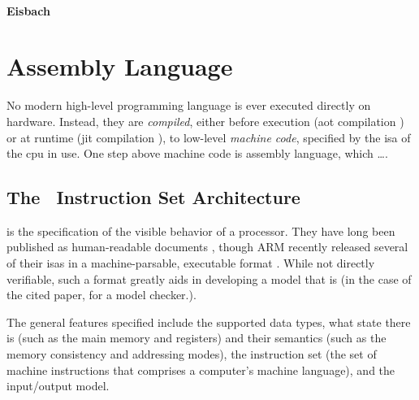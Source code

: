 \paragraph{Eisbach}


%
%

\section{Assembly Language}\label{se:assembly_language}
No modern high-level programming language is ever executed directly on hardware.
Instead, they are \emph{compiled},%
either before execution (\ac{aot} compilation \autocite{})%
or at runtime (\ac{jit} compilation \autocite{}),
to low-level \emph{machine code}, specified by the \ac{isa} of the \ac{cpu} in use.
One step above machine code is assembly language,
which \todo\dots.

\subsection{The \arch\ Instruction Set Architecture}
 is the specification of the visible behavior of a processor.
They have long been published as human-readable documents
\autocite{bowen1985cards,intel2019manual},
though ARM recently released several of their \acp{isa} in a machine-parsable,
executable format \autocite{reid2016arm}. While not directly verifiable,
such a format greatly aids in developing a model that is \autocite{reid2016endtoend}
(in the case of the cited paper, for a model checker.).




The general features specified include the supported data types,
what state there is (such as the main memory and registers)
and their semantics (such as the memory consistency and addressing modes), the instruction set (the set of machine instructions that comprises a computer's machine language), and the input/output model. 

